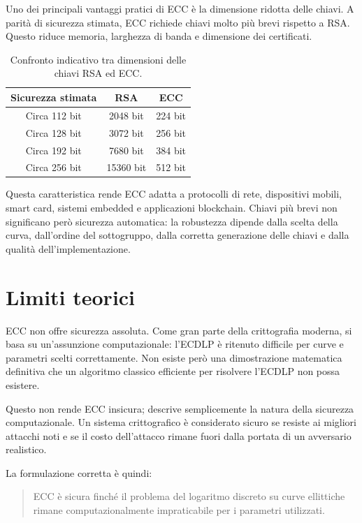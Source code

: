 \documentclass[12pt,a4paper,oneside]{report}
\begin{document}
Uno dei principali vantaggi pratici di ECC è la dimensione ridotta delle chiavi. A parità di sicurezza stimata, ECC richiede chiavi molto più brevi rispetto a RSA. Questo riduce memoria, larghezza di banda e dimensione dei certificati.

\begin{table}[h]
\centering
\begin{tabular}{ccc}
\toprule
\textbf{Sicurezza stimata} & \textbf{RSA} & \textbf{ECC} \\
\midrule
Circa 112 bit & 2048 bit & 224 bit \\
Circa 128 bit & 3072 bit & 256 bit \\
Circa 192 bit & 7680 bit & 384 bit \\
Circa 256 bit & 15360 bit & 512 bit \\
\bottomrule
\end{tabular}
\caption{Confronto indicativo tra dimensioni delle chiavi RSA ed ECC.}
\label{tab:key-size-comparison}
\end{table}

Questa caratteristica rende ECC adatta a protocolli di rete, dispositivi mobili, smart card, sistemi embedded e applicazioni blockchain. Chiavi più brevi non significano però sicurezza automatica: la robustezza dipende dalla scelta della curva, dall'ordine del sottogruppo, dalla corretta generazione delle chiavi e dalla qualità dell'implementazione.

\section{Limiti teorici}

ECC non offre sicurezza assoluta. Come gran parte della crittografia moderna, si basa su un'assunzione computazionale: l'ECDLP è ritenuto difficile per curve e parametri scelti correttamente. Non esiste però una dimostrazione matematica definitiva che un algoritmo classico efficiente per risolvere l'ECDLP non possa esistere.

Questo non rende ECC insicura; descrive semplicemente la natura della sicurezza computazionale. Un sistema crittografico è considerato sicuro se resiste ai migliori attacchi noti e se il costo dell'attacco rimane fuori dalla portata di un avversario realistico.

La formulazione corretta è quindi:

\begin{quote}
ECC è sicura finché il problema del logaritmo discreto su curve ellittiche rimane computazionalmente impraticabile per i parametri utilizzati.
\end{quote}
\end{document}
